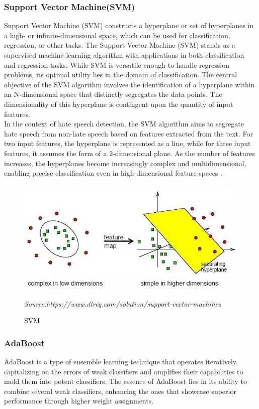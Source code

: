 \subsubsection{Support Vector Machine(SVM)}
Support Vector Machine (SVM) constructs a hyperplane or set of hyperplanes in a high- or infinite-dimensional space, which can be used for classification, regression, or other tasks. The Support Vector Machine (SVM) stands as a supervised machine learning algorithm with applications in both classification and regression tasks. While SVM is versatile enough to handle regression problems, its optimal utility lies in the domain of classification. The central objective of the SVM algorithm involves the identification of a hyperplane within an N-dimensional space that distinctly segregates the data points. The dimensionality of this hyperplane is contingent upon the quantity of input features.\\
In the context of hate speech detection, the SVM algorithm aims to segregate hate speech from non-hate speech based on features extracted from the text. For two input features, the hyperplane is represented as a line, while for three input features, it assumes the form of a 2-dimensional plane. As the number of features increases, the hyperplanes become increasingly complex and multidimensional, enabling precise classification even in high-dimensional feature spaces \cite{pralhad}.
\begin{figure}[h]
\centering
\includegraphics[scale=0.65]{images/svm.png}
\caption{SVM}
\textit{Source:https://www.dtreg.com/solution/support-vector-machines}
\end{figure}

\subsubsection{AdaBoost}
AdaBoost is a type of ensemble learning technique that operates iteratively, capitalizing on the errors of weak classifiers and amplifies their capabilities to mold them into potent classifiers. The essence of AdaBoost lies in its ability to combine several weak classifiers, enhancing the ones that showcase superior performance through higher weight assignments.    

